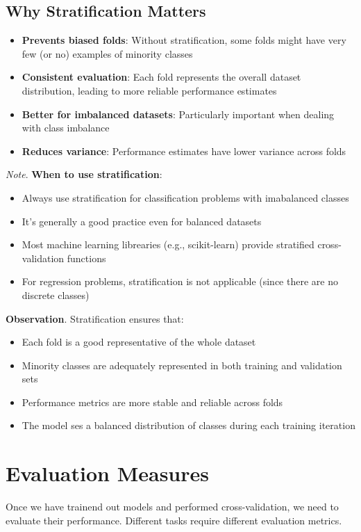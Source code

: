 \documentclass[a4paper]{article}
\theoremstyle{definition}
\begin{document}
\subsection{Why Stratification Matters}
\begin{itemize}
    \item \textbf{Prevents biased folds}: Without stratification, some folds might have very few (or no) examples of minority classes 
    \item \textbf{Consistent evaluation}: Each fold represents the overall dataset distribution, leading to more reliable performance estimates 
    \item \textbf{Better for imbalanced datasets}: Particularly important when dealing with class imbalance 
    \item \textbf{Reduces variance}: Performance estimates have lower variance across folds
\end{itemize}
\textit{Note}. \textbf{When to use stratification}:
\begin{itemize}
    \item Always use stratification for classification problems with imabalanced classes 
    \item It's generally a good practice even for balanced datasets 
    \item Most machine learning librearies (e.g., scikit-learn) provide stratified cross-validation functions 
    \item For regression problems, stratification is not applicable (since there are no discrete classes)
\end{itemize}
\textbf{Observation}. Stratification ensures that:
\begin{itemize}
    \item Each fold is a good representative of the whole dataset
    \item Minority classes are adequately represented in both training and validation sets 
    \item Performance metrics are more stable and reliable across folds 
    \item The model ses a balanced distribution of classes during each training iteration
\end{itemize}
\section{Evaluation Measures}
Once we have trainend out models and performed cross-validation, we need to evaluate their performance.
Different tasks require different evaluation metrics.
\end{document}
